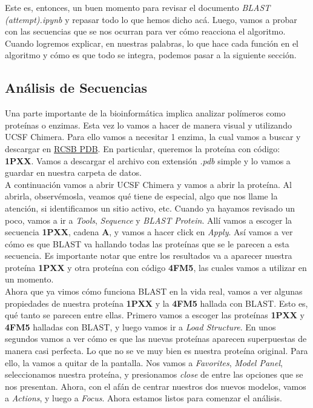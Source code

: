 \documentclass[10pt,letterpaper]{article}
\begin{document}
Este es, entonces, un buen momento para revisar el documento \emph{BLAST (attempt).ipynb} y repasar todo lo que hemos dicho ac\'a. Luego, vamos a probar con las secuencias que se nos ocurran para ver c\'omo reacciona el algoritmo. Cuando logremos explicar, en nuestras palabras, lo que hace cada funci\'on en el algoritmo y c\'omo es que todo se integra, podemos pasar a la siguiente secci\'on.

\subsection{An\'alisis de Secuencias}
Una parte importante de la bioinform\'atica implica analizar pol\'imeros como prote\'inas o enzimas. Esta vez lo vamos a hacer de manera visual y utilizando UCSF Chimera. Para ello vamos a necesitar 1 enzima, la cual vamos a buscar y descargar en \href{http://www.rcsb.org/pdb/home/home.do}{RCSB PDB}. En particular, queremos la prote\'ina con c\'odigo: \textbf{1PXX}. Vamos a descargar el archivo con extensi\'on \emph{.pdb} simple y lo vamos a guardar en nuestra carpeta de datos.\\

A continuaci\'on vamos a abrir UCSF Chimera y vamos a abrir la prote\'ina. Al abrirla, observ\'emosla, veamos qu\'e tiene de especial, algo que nos llame la atenci\'on, si identificamos un sitio activo, etc. Cuando ya hayamos revisado un poco, vamos a ir a \emph{Tools}, \emph{Sequence} y \emph{BLAST Protein}. All\'i vamos a escoger la secuencia \textbf{1PXX}, cadena \textbf{A}, y vamos a hacer click en \emph{Apply}. As\'i vamos a ver c\'omo es que BLAST va hallando todas las prote\'inas que se le parecen a esta secuencia. Es importante notar que entre los resultados va a aparecer nuestra prote\'ina \textbf{1PXX} y otra prote\'ina con c\'odigo \textbf{4FM5}, las cuales vamos a utilizar en un momento.\\

Ahora que ya vimos c\'omo funciona BLAST en la vida real, vamos a ver algunas propiedades de nuestra prote\'ina \textbf{1PXX} y la \textbf{4FM5} hallada con BLAST. Esto es, qu\'e tanto se parecen entre ellas. Primero vamos a escoger las prote\'inas \textbf{1PXX} y \textbf{4FM5} halladas con BLAST, y luego vamos ir a \emph{Load Structure}. En unos segundos vamos a ver c\'omo es que las nuevas prote\'inas aparecen superpuestas de manera casi perfecta. Lo que no se ve muy bien es nuestra prote\'ina original. Para ello, la vamos a quitar de la pantalla. Nos vamos a \emph{Favorites}, \emph{Model Panel}, seleccionamos nuestra prote\'ina, y presionamos \emph{close} de entre las opciones que se nos presentan. Ahora, con el af\'an de centrar nuestros dos nuevos modelos, vamos a \emph{Actions}, y luego a \emph{Focus}. Ahora estamos listos para comenzar el an\'alisis.\\
\end{document}
